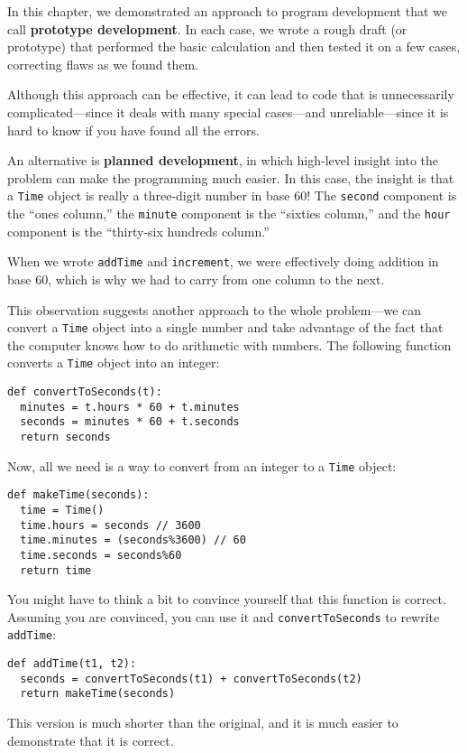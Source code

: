 In this chapter, we demonstrated an approach to program
development that we call {\bf prototype development}. In each
case, we wrote a rough draft (or prototype) that performed the basic
calculation and then tested it on a few cases, correcting flaws as we
found them.

Although this approach can be effective, it can lead to code that is
unnecessarily complicated---since it deals with many special
cases---and unreliable---since it is hard to know if you have found
all the errors.

An alternative is {\bf planned development}, in which high-level insight
into the problem can make the programming much easier.  In this case,
the insight is that a {\tt Time} object is really a three-digit number
in base 60!  The {\tt second} component is the ``ones column,'' the
{\tt minute} component is the ``sixties column,'' and the {\tt hour}
component is the ``thirty-six hundreds column.''

When we wrote {\tt addTime} and {\tt increment}, we were effectively
doing addition in base 60, which is why we had to carry from one
column to the next.

This observation suggests another approach to the whole problem---we
can convert a {\tt Time} object into a single number and take
advantage of the fact that the computer knows how to do arithmetic
with numbers.  The following function converts a {\tt Time}
object into an integer:

\beforeverb
\begin{verbatim}
def convertToSeconds(t):
  minutes = t.hours * 60 + t.minutes
  seconds = minutes * 60 + t.seconds
  return seconds
\end{verbatim}
\afterverb
%
Now, all we need is a way to convert from an integer to a {\tt Time}
object:


\beforeverb
\begin{verbatim}
def makeTime(seconds):
  time = Time()
  time.hours = seconds // 3600
  time.minutes = (seconds%3600) // 60
  time.seconds = seconds%60
  return time
\end{verbatim}
\afterverb
%
You might have to think a bit to convince yourself that this function
is correct.  Assuming you are convinced, you can use it and
{\tt convertToSeconds}
to rewrite {\tt addTime}:

\beforeverb
\begin{verbatim}
def addTime(t1, t2):
  seconds = convertToSeconds(t1) + convertToSeconds(t2)
  return makeTime(seconds)
\end{verbatim}
\afterverb
%
This version is much shorter than the original, and it is much easier to
demonstrate that it is correct.

